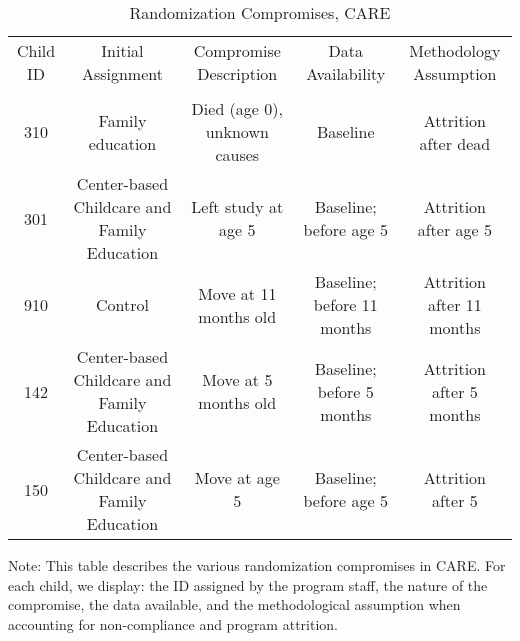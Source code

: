 \begin{sidewaystable}[H] 
\begin{threeparttable}
\caption{Randomization Compromises, CARE}
\label{table:care_compromises}
\centering
\footnotesize
\begin{tabular}{ccccc} \toprule
Child ID & Initial Assignment & Compromise Description & Data Availability & Methodology Assumption \\ \\ \midrule
310 & Family education & Died (age 0), unknown causes & Baseline & Attrition after dead \\
301 & Center-based Childcare and Family Education  & Left study at age 5  & Baseline; before age 5 & Attrition after age 5 \\
910 & Control & Move at 11 months old & Baseline; before 11 months & Attrition after 11 months \\
142 & Center-based Childcare and Family Education & Move at 5 months old & Baseline; before 5 months & Attrition after 5 months \\
150 & Center-based Childcare and Family Education & Move at age 5 & Baseline; before age 5 & Attrition after 5 \\ \bottomrule
\end{tabular}
\begin{tablenotes}
\item Note: This table describes the various randomization compromises in CARE. For each child, we display: the ID assigned by the program staff, the nature of the compromise, the data available, and the methodological assumption when accounting for non-compliance and program attrition. 
\end{tablenotes}
\end{threeparttable}
\end{sidewaystable}